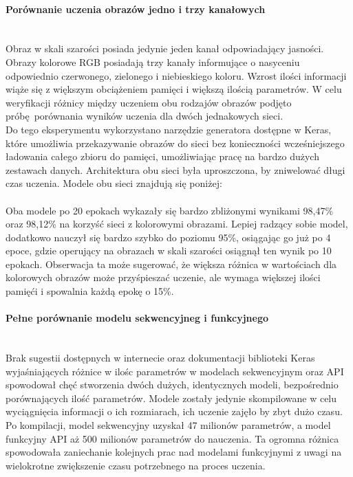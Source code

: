 \paragraph{Porównanie uczenia obrazów jedno i trzy kanałowych} \mbox{}\\
Obraz w skali szarości posiada jedynie jeden kanał odpowiadający jasności. Obrazy kolorowe RGB
posiadają trzy kanały informujące o nasyceniu odpowiednio czerwonego, zielonego i niebieskiego koloru.
Wzrost ilości informacji wiąże się z większym obciążeniem pamięci i większą ilością parametrów.
W celu weryfikacji różnicy między uczeniem obu rodzajów obrazów podjęto próbę porównania wyników
uczenia dla dwóch jednakowych sieci.\\
Do tego eksperymentu wykorzystano narzędzie generatora dostępne w Keras, które umożliwia
przekazywanie obrazów do sieci bez konieczności wcześniejszego ładowania całego zbioru
do pamięci, umożliwiając pracę na bardzo dużych zestawach danych. Architektura obu
sieci była uproszczona, by zniwelować długi czas uczenia. Modele obu sieci znajdują się poniżej:\\\\
Oba modele po 20 epokach wykazały się bardzo zbliżonymi wynikami 98,47\% oraz 98,12\%
na korzyść sieci z kolorowymi obrazami. Lepiej radzący sobie model, dodatkowo nauczył
się bardzo szybko do poziomu 95\%, osiągając go już po 4 epoce, gdzie operujący na
obrazach w skali szarości osiągnął ten wynik po 10 epokach. Obserwacja ta może sugerować,
że większa różnica w wartościach dla kolorowych obrazów może przyśpieszać uczenie, ale
wymaga większej ilości pamięći i spowalnia każdą epokę o 15\%.

\paragraph{Pełne porównanie modelu sekwencyjneg i funkcyjnego} \mbox{}\\
Brak sugestii dostępnych w internecie oraz dokumentacji biblioteki Keras wyjaśniających różnice
w ilośc parametrów w modelach sekwencyjnym oraz API spowodował chęć stworzenia dwóch dużych,
identycznych modeli, bezpośrednio porównających ilość parametrów. Modele zostały jedynie
skompilowane w celu wyciągnięcia informacji o ich rozmiarach, ich uczenie zajęło by zbyt dużo czasu.\\
Po kompilacji, model sekwencyjny uzyskał 47 milionów parametrów, a model funkcyjny API
aż 500 milionów parametrów do nauczenia. Ta ogromna różnica spowodowała zaniechanie
kolejnych prac nad modelami funkcyjnymi z uwagi na wielokrotne zwiększenie czasu potrzebnego
na proces uczenia.

